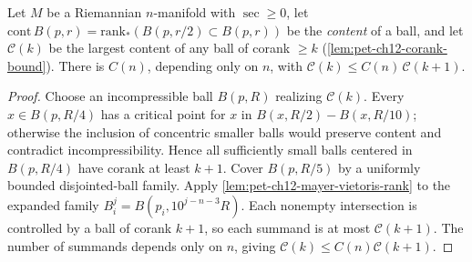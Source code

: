 \begin{lemma}
  \label{lem:pet-ch12-content-ratio-bound}
  Let $M$ be a Riemannian $n$-manifold with $\sec\ge0$, let
  $\mathrm{cont}\,B(p,r)=\mathrm{rank}_*(B(p,r/2)\subset B(p,r))$ be the
  \emph{content} of a ball, and let $\mathcal{C}(k)$ be the largest content of
  any ball of corank $\ge k$ (\cref{lem:pet-ch12-corank-bound}). There is
  $C(n)$, depending only on $n$, with $\mathcal{C}(k)\le
  C(n)\,\mathcal{C}(k+1)$.
\end{lemma}
\begin{proof}
  \sketch
  Choose an incompressible ball \(B(p,R)\) realizing \(\mathcal C(k)\). Every
  \(x\in B(p,R/4)\) has a critical point for \(x\) in
  \(B(x,R/2)-B(x,R/10)\); otherwise the inclusion of concentric smaller
  balls would preserve content and contradict incompressibility. Hence all
  sufficiently small balls centered in \(B(p,R/4)\) have corank at least
  \(k+1\). Cover \(B(p,R/5)\) by a uniformly bounded disjointed-ball
  family. Apply \cref{lem:pet-ch12-mayer-vietoris-rank} to the expanded family
  \(B_i^j=B(p_i,10^{j-n-3}R)\). Each nonempty intersection is controlled by a
  ball of corank \(k+1\), so each summand is at most \(\mathcal C(k+1)\).
  The number of summands depends only on \(n\), giving
  \(\mathcal C(k)\le C(n)\mathcal C(k+1)\).
\end{proof}


